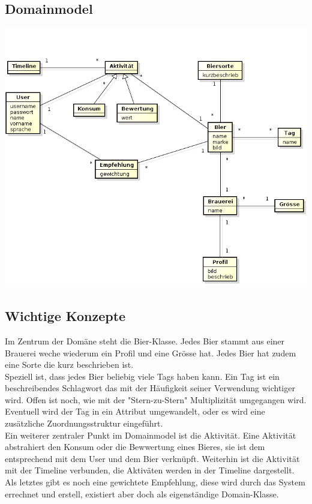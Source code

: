 \documentclass[10pt,a4paper]{scrartcl}
\begin{document}
\subsection{Domainmodel}
\includegraphics[width=\textwidth]{domain.model.bieridee.png} 

\subsection{Wichtige Konzepte}
Im Zentrum der Domäne steht die Bier-Klasse. Jedes Bier stammt aus einer Brauerei weche wiederum ein Profil und eine Grösse hat. Jedes Bier hat zudem eine Sorte die kurz beschrieben ist.\\
Speziell ist, dass jedes Bier beliebig viele Tags haben kann. Ein Tag ist ein beschreibendes Schlagwort das mit der Häufigkeit seiner Verwendung wichtiger wird. Offen ist noch, wie mit der "Stern-zu-Stern" Multiplizität umgegangen wird. Eventuell wird der Tag in ein Attribut umgewandelt, oder es wird eine zusätzliche Zuordnungsstruktur eingeführt.\\
Ein weiterer zentraler Punkt im Domainmodel ist die Aktivität. Eine Aktivität abstrahiert den Konsum oder die Bewwertung eines Bieres, sie ist dem entsprechend mit dem User und dem Bier verknüpft. Weiterhin ist die Aktivität mit der Timeline verbunden, die Aktiväten werden in der Timeline dargestellt.\\
Als letztes gibt es noch eine gewichtete Empfehlung, diese wird durch das System errechnet und erstell, existiert aber doch als eigenständige Domain-Klasse.
\end{document}
